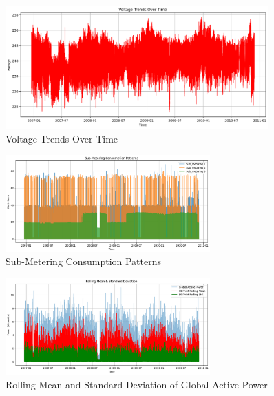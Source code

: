 	\begin{figure}[htbp]
		\centering
		\includegraphics[width=0.9\textwidth]{./figures_aman/voltage_trends_over_time.png}
		\caption{Voltage Trends Over Time}
		\label{fig:voltage_trends}
	\end{figure}
	
	\begin{figure}[htbp]
		\centering
		\includegraphics[width=0.7\textwidth]{./figures_aman/sub_metering_patterns.png}
		\caption{Sub-Metering Consumption Patterns}
		\label{fig:sub_metering}
	\end{figure}
	
	\begin{figure}[htbp]
		\centering
		\includegraphics[width=0.7\textwidth]{./figures_aman/rolling_mean_std.png}
		\caption{Rolling Mean and Standard Deviation of Global Active Power}
		\label{fig:rolling_stats}
	\end{figure}
	
